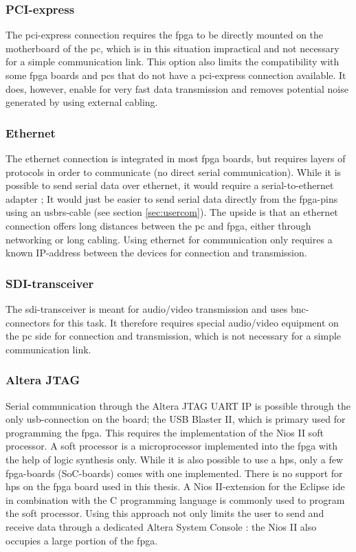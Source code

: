 \documentclass[main.tex]{subfiles}
\begin{document}
\subsubsection{PCI-express}
The \gls{pci}-express connection requires the \gls{fpga} to be directly mounted on the motherboard of the \acrshort{pc}, which is in this situation impractical and not necessary for a simple communication link. This option also limits the compatibility with some \gls{fpga} boards and \acrshort{pc}s that do not have a \gls{pci}-express connection available. It does, however, enable for very fast data transmission and removes potential noise generated by using external cabling. 

\subsubsection{Ethernet}
The ethernet connection is integrated in most \gls{fpga} boards, but requires layers of protocols in order to communicate (no direct serial communication). While it is possible to send serial data over ethernet, it would require a serial-to-ethernet adapter \cite{serial2ethernet}; It would just be easier to send serial data directly from the \gls{fpga}-pins using an \gls{usbrs}-cable (see section \ref{sec:usercom}). The upside is that an ethernet connection offers long distances between the \acrshort{pc} and \gls{fpga}, either through networking or long cabling. Using ethernet for communication only requires a known IP-address between the devices for connection and transmission.

\subsubsection{SDI-transceiver}
The \acrshort{sdi}-transceiver is meant for audio/video transmission and uses \acrshort{bnc}-connectors for this task. It therefore requires special audio/video equipment on the \acrshort{pc} side for connection and transmission, which is not necessary for a simple communication link.

\subsubsection{Altera JTAG}
Serial communication through the Altera JTAG UART IP is possible through the only \acrshort{usb}-connection on the board; the USB Blaster II, which is primary used for programming the \gls{fpga}. This requires the implementation of the Nios II soft processor. A soft processor is a microprocessor implemented into the \gls{fpga} with the help of logic synthesis only. While it is also possible to use a \gls{hps}, only a few \gls{fpga}-boards (SoC-boards) comes with one implemented. There is no support for \gls{hps} on the \gls{fpga} board used in this thesis. A Nios II-extension for the Eclipse \acrshort{ide} in combination with the C programming language is commonly used to program the soft processor. Using this approach not only limits the user to send and receive data through a dedicated Altera System Console \cite{altera_terminals14}: the Nios II also occupies a large portion of the \gls{fpga}.
\end{document}
